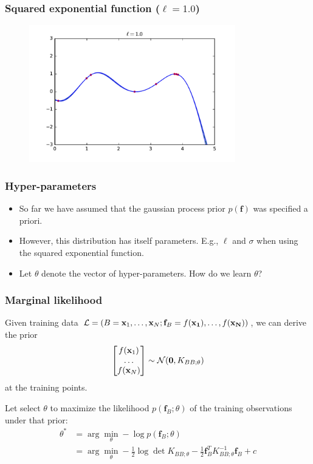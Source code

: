 \documentclass{beamer}
\begin{document}
\begin{frame}
    \frametitle{Squared exponential function ($\ell=1.0$)}

    \begin{figure}
        \centering
        \includegraphics[width=0.8\textwidth]{./figures/rbf-10.pdf}
    \end{figure}
\end{frame}


\begin{frame}
    \frametitle{Hyper-parameters}

    \begin{itemize}
        \item So far we have assumed that the gaussian process prior $p(\mathbf{f})$
        was specified a priori.

        \item However, this distribution has itself parameters. E.g., $\ell$ and $\sigma$ when
        using the squared exponential function.

        \item Let $\theta$ denote the vector of hyper-parameters. How do we learn $\theta$?
    \end{itemize}
\end{frame}


\begin{frame}
    \frametitle{Marginal likelihood}

    Given training data ${\cal L} = (B = \mathbf{x}_1, \dots, \mathbf{x}_N; \mathbf{f}_B = f(\mathbf{x_1}), \dots, f(\mathbf{x_N} ))$,
    we can derive the prior
        $$\begin{bmatrix} f(\mathbf{x}_1)\\
                          \dots \\
                          f(\mathbf{x}_N) \end{bmatrix} \sim {\cal N}(\mathbf{0}, K_{BB;\theta})$$
    at the training points.

    Let select $\theta$ to maximize the likelihood $p(\mathbf{f}_B;\theta)$ of the training observations under that prior:
    \begin{align*}
        \theta^* &= \arg \min_\theta - \log p(\mathbf{f}_B;\theta) \\
                 &= \arg \min_\theta - \frac{1}{2} \log \det K_{BB;\theta} - \frac{1}{2} \mathbf{f}_B^T K_{BB;\theta}^{-1} \mathbf{f}_B + c
    \end{align*}

\end{frame}
\end{document}
